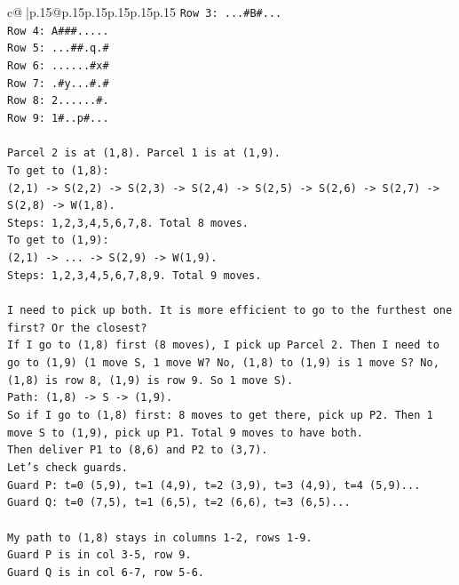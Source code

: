 \documentclass{article}
\begin{document}
{\begin{supertabular}{c@{$\;$}|p{.15\linewidth}@{}p{.15\linewidth}p{.15\linewidth}p{.15\linewidth}p{.15\linewidth}p{.15\linewidth}}
{{{\texttt{Row 3: ...\#B\#...} \\
\texttt{Row 4: A\#\#\#.....} \\
\texttt{Row 5: ...\#\#.q.\#} \\
\texttt{Row 6: ......\#x\#} \\
\texttt{Row 7: .\#y...\#.\#} \\
\texttt{Row 8: 2......\#.} \\
\texttt{Row 9: 1\#..p\#...} \\
\\ 
\texttt{Parcel 2 is at (1,8). Parcel 1 is at (1,9).} \\
\texttt{To get to (1,8):} \\
\texttt{(2,1) {-}> S(2,2) {-}> S(2,3) {-}> S(2,4) {-}> S(2,5) {-}> S(2,6) {-}> S(2,7) {-}> S(2,8) {-}> W(1,8).} \\
\texttt{Steps: 1,2,3,4,5,6,7,8. Total 8 moves.} \\
\texttt{To get to (1,9):} \\
\texttt{(2,1) {-}> ... {-}> S(2,9) {-}> W(1,9).} \\
\texttt{Steps: 1,2,3,4,5,6,7,8,9. Total 9 moves.} \\
\\ 
\texttt{I need to pick up both. It is more efficient to go to the furthest one first? Or the closest?} \\
\texttt{If I go to (1,8) first (8 moves), I pick up Parcel 2. Then I need to go to (1,9) (1 move S, 1 move W? No, (1,8) to (1,9) is 1 move S? No, (1,8) is row 8, (1,9) is row 9. So 1 move S).} \\
\texttt{Path: (1,8) {-}> S {-}> (1,9).} \\
\texttt{So if I go to (1,8) first: 8 moves to get there, pick up P2. Then 1 move S to (1,9), pick up P1. Total 9 moves to have both.} \\
\texttt{Then deliver P1 to (8,6) and P2 to (3,7).} \\
\texttt{Let's check guards.} \\
\texttt{Guard P: t=0 (5,9), t=1 (4,9), t=2 (3,9), t=3 (4,9), t=4 (5,9)...} \\
\texttt{Guard Q: t=0 (7,5), t=1 (6,5), t=2 (6,6), t=3 (6,5)...} \\
\\ 
\texttt{My path to (1,8) stays in columns 1{-}2, rows 1{-}9.} \\
\texttt{Guard P is in col 3{-}5, row 9.} \\
\texttt{Guard Q is in col 6{-}7, row 5{-}6.} \\
}}}
\end{supertabular}}
\end{document}

